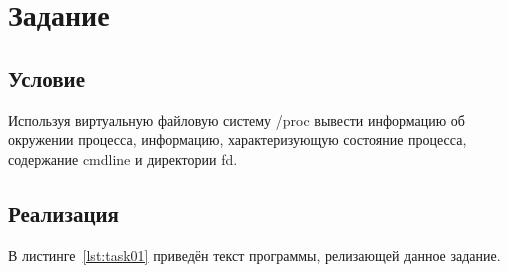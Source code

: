 \chapter{Задание }

\section{Условие}
Используя виртуальную файловую систему /proc вывести информацию об окружении процесса, информацию, характеризующую состояние процесса, содержание cmdline и директории fd.

\section{Реализация}

В листинге~\ref{lst:task01} приведён текст программы, релизающей данное задание.

